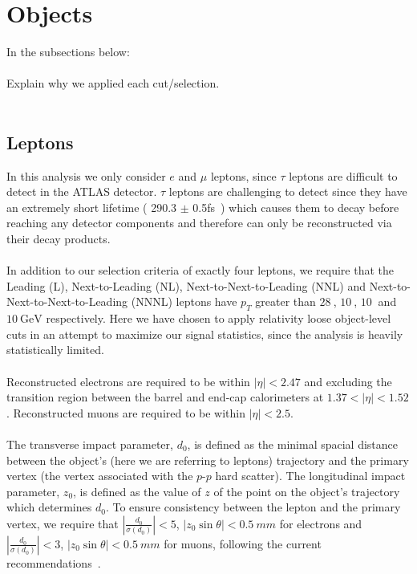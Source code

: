 \section{Objects}
In the subsections below:\\\\
Explain why we applied each cut/selection.\\\\


\subsection{Leptons}
In this analysis we only consider $e$ and $\mu$ leptons, since $\tau$ leptons are difficult to detect in the ATLAS detector. $\tau$ leptons are challenging to detect since they have an extremely short lifetime ( 290.3 $\pm$ 0.5fs~\cite{pdg}) which causes them to decay before reaching any detector components and therefore can only be reconstructed via their decay products.\\\\


In addition to our selection criteria of exactly four leptons, we require that the Leading (L), Next-to-Leading (NL), Next-to-Next-to-Leading (NNL) and Next-to-Next-to-Next-to-Leading (NNNL) leptons have $p_{T}$ greater than $\SI{28}{}$, $\SI{10}{}$, $\SI{10}{}$ and $\SI{10}{\GeV}$ respectively. Here we have chosen to apply relativity loose object-level cuts in an attempt to maximize our signal statistics, since the analysis is heavily statistically limited.\\\\


Reconstructed electrons are required to be within $|\eta| < 2.47$ and excluding the transition region between the barrel and end-cap calorimeters at $1.37 < |\eta| < 1.52$. Reconstructed muons are required to be within $|\eta| < 2.5$.\\\\

The transverse impact parameter, $d_{0}$, is defined as the minimal spacial distance between the object's (here we are referring to leptons) trajectory and the primary vertex (the vertex associated with the $p$-$p$ hard scatter). The longitudinal impact parameter, $z_{0}$, is defined as the value of $z$ of the point on the object's trajectory which determines $d_{0}$. To ensure consistency between the lepton and the primary vertex, we require that $|\frac{d_{0}}{\sigma(d_{0})}| < 5$, $|z_{0}\sin{\theta}| < \SI{0.5}{mm}$ for electrons and $|\frac{d_{0}}{\sigma(d_{0})}| < 3$, $|z_{0}\sin{\theta}| < \SI{0.5}{mm}$ for muons, following the current recommendations~\cite{TopRecoObjTwikiModel}.\\\\


